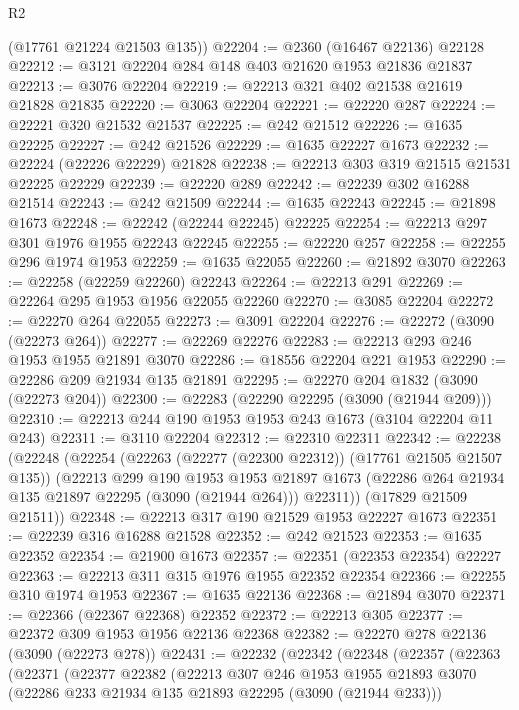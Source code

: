 \begin{lexlean}{R2}
\begin{coremodule}
      (@17761 @21224 @21503 @135))
@22204 := @2360 (@16467 @22136) @22128
@22212 := @3121 @22204 @284 @148 @403 @21620 @1953 @21836 @21837
@22213 := @3076 @22204
@22219 := @22213 @321 @402 @21538 @21619 @21828 @21835
@22220 := @3063 @22204
@22221 := @22220 @287
@22224 := @22221 @320 @21532 @21537
@22225 := @242 @21512
@22226 := @1635 @22225
@22227 := @242 @21526
@22229 := @1635 @22227 @1673
@22232 := @22224 (@22226 @22229) @21828
@22238 := @22213 @303 @319 @21515 @21531 @22225 @22229
@22239 := @22220 @289
@22242 := @22239 @302 @16288 @21514
@22243 := @242 @21509
@22244 := @1635 @22243
@22245 := @21898 @1673
@22248 := @22242 (@22244 @22245) @22225
@22254 := @22213 @297 @301 @1976 @1955 @22243 @22245
@22255 := @22220 @257
@22258 := @22255 @296 @1974 @1953
@22259 := @1635 @22055
@22260 := @21892 @3070
@22263 := @22258 (@22259 @22260) @22243
@22264 := @22213 @291
@22269 := @22264 @295 @1953 @1956 @22055 @22260
@22270 := @3085 @22204
@22272 := @22270 @264 @22055
@22273 := @3091 @22204
@22276 := @22272 (@3090 (@22273 @264))
@22277 := @22269 @22276
@22283 := @22213 @293 @246 @1953 @1955 @21891 @3070
@22286 := @18556 @22204 @221 @1953
@22290 := @22286 @209 @21934 @135 @21891
@22295 := @22270 @204 @1832 (@3090 (@22273 @204))
@22300 := @22283 (@22290 @22295 (@3090 (@21944 @209)))
@22310 := @22213 @244 @190 @1953 @1953 @243 @1673 (@3104 @22204 @11 @243)
@22311 := @3110 @22204
@22312 := @22310 @22311
@22342 := @22238
    (@22248
      (@22254
        (@22263 (@22277 (@22300 @22312)) (@17761 @21505 @21507 @135))
        (@22213
          @299
          @190
          @1953
          @1953
          @21897
          @1673
          (@22286 @264 @21934 @135 @21897 @22295 (@3090 (@21944 @264)))
          @22311))
      (@17829 @21509 @21511))
@22348 := @22213 @317 @190 @21529 @1953 @22227 @1673
@22351 := @22239 @316 @16288 @21528
@22352 := @242 @21523
@22353 := @1635 @22352
@22354 := @21900 @1673
@22357 := @22351 (@22353 @22354) @22227
@22363 := @22213 @311 @315 @1976 @1955 @22352 @22354
@22366 := @22255 @310 @1974 @1953
@22367 := @1635 @22136
@22368 := @21894 @3070
@22371 := @22366 (@22367 @22368) @22352
@22372 := @22213 @305
@22377 := @22372 @309 @1953 @1956 @22136 @22368
@22382 := @22270 @278 @22136 (@3090 (@22273 @278))
@22431 := @22232
    (@22342
      (@22348
        (@22357
          (@22363
            (@22371
              (@22377
                @22382
                (@22213
                  @307
                  @246
                  @1953
                  @1955
                  @21893
                  @3070
                  (@22286 @233 @21934 @135 @21893 @22295 (@3090 (@21944 @233)))

\end{coremodule}
\end{lexlean}
